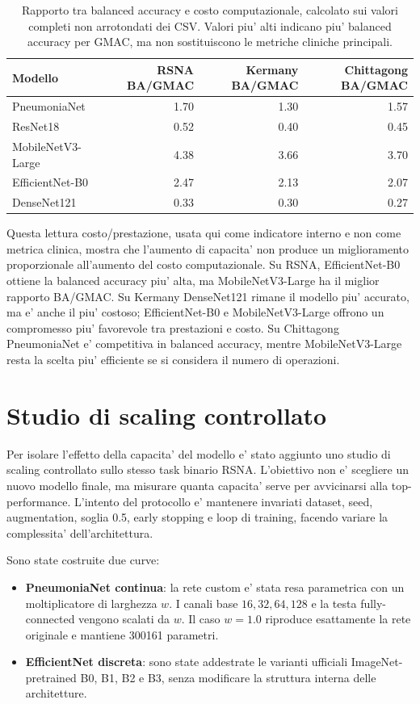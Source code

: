 \documentclass[11pt,a4paper]{article}
\newcommand{\balacc}{balanced accuracy}
\begin{document}
\begin{table}[H]
\centering
\caption{Rapporto tra \balacc{} e costo computazionale, calcolato sui valori completi non arrotondati dei CSV. Valori piu' alti indicano piu' \balacc{} per GMAC, ma non sostituiscono le metriche cliniche principali.}
\begin{tabular}{lrrr}
\toprule
Modello & RSNA BA/GMAC & Kermany BA/GMAC & Chittagong BA/GMAC \\
\midrule
PneumoniaNet & 1.70 & 1.30 & 1.57 \\
ResNet18 & 0.52 & 0.40 & 0.45 \\
MobileNetV3-Large & 4.38 & 3.66 & 3.70 \\
EfficientNet-B0 & 2.47 & 2.13 & 2.07 \\
DenseNet121 & 0.33 & 0.30 & 0.27 \\
\bottomrule
\end{tabular}
\end{table}

Questa lettura costo/prestazione, usata qui come indicatore interno e non come
metrica clinica, mostra che l'aumento di capacita' non produce
un miglioramento proporzionale all'aumento del costo computazionale. Su RSNA,
EfficientNet-B0 ottiene la \balacc{} piu' alta, ma MobileNetV3-Large ha il
miglior rapporto BA/GMAC. Su Kermany DenseNet121 rimane il modello piu'
accurato, ma e' anche il piu' costoso; EfficientNet-B0 e MobileNetV3-Large
offrono un compromesso piu' favorevole tra prestazioni e costo. Su Chittagong
PneumoniaNet e' competitiva in \balacc{}, mentre MobileNetV3-Large resta la
scelta piu' efficiente se si considera il numero di operazioni.

\section{Studio di scaling controllato}

Per isolare l'effetto della capacita' del modello e' stato aggiunto uno studio
di scaling controllato sullo stesso task binario RSNA. L'obiettivo non e'
scegliere un nuovo modello finale, ma misurare quanta capacita' serve per
avvicinarsi alla top-performance. L'intento del protocollo e' mantenere invariati
dataset, seed, augmentation, soglia 0.5, early stopping e loop di training,
facendo variare la complessita' dell'architettura.

Sono state costruite due curve:

\begin{itemize}
  \item \textbf{PneumoniaNet continua}: la rete custom e' stata resa parametrica
  con un moltiplicatore di larghezza \(w\). I canali base
  \(16,32,64,128\) e la testa fully-connected vengono scalati da \(w\).
  Il caso \(w=1.0\) riproduce esattamente la rete originale e mantiene
  300161 parametri.
  \item \textbf{EfficientNet discreta}: sono state addestrate le varianti
  ufficiali ImageNet-pretrained B0, B1, B2 e B3, senza modificare la struttura
  interna delle architetture.
\end{itemize}
\end{document}
